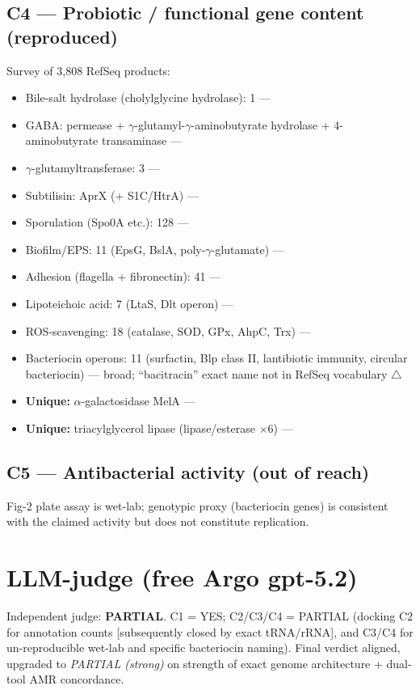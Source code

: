 \documentclass[11pt]{article}
\begin{document}
\subsection{C4 --- Probiotic / functional gene content (reproduced)}
Survey of 3,808 RefSeq products:
\begin{itemize}[leftmargin=*,noitemsep]
    \item Bile-salt hydrolase (cholylglycine hydrolase): 1 --- \checkmark
    \item GABA: permease + $\gamma$-glutamyl-$\gamma$-aminobutyrate hydrolase + 4-aminobutyrate transaminase --- \checkmark
    \item $\gamma$-glutamyltransferase: 3 --- \checkmark
    \item Subtilisin: AprX (+ S1C/HtrA) --- \checkmark
    \item Sporulation (Spo0A etc.): 128 --- \checkmark
    \item Biofilm/EPS: 11 (EpsG, BslA, poly-$\gamma$-glutamate) --- \checkmark
    \item Adhesion (flagella + fibronectin): 41 --- \checkmark
    \item Lipoteichoic acid: 7 (LtaS, Dlt operon) --- \checkmark
    \item ROS-scavenging: 18 (catalase, SOD, GPx, AhpC, Trx) --- \checkmark
    \item Bacteriocin operons: 11 (surfactin, Blp class II, lantibiotic immunity, circular bacteriocin) --- \checkmark broad; ``bacitracin'' exact name not in RefSeq vocabulary $\triangle$
    \item \textbf{Unique:} $\alpha$-galactosidase MelA --- \checkmark
    \item \textbf{Unique:} triacylglycerol lipase (lipase/esterase $\times$6) --- \checkmark
\end{itemize}

\subsection{C5 --- Antibacterial activity (out of reach)}
Fig-2 plate assay is wet-lab; genotypic proxy (bacteriocin genes) is consistent with the claimed activity but does not constitute replication.

\section{LLM-judge (free Argo gpt-5.2)}
Independent judge: \textbf{PARTIAL}. C1 = YES; C2/C3/C4 = PARTIAL (docking C2 for annotation counts [subsequently closed by exact tRNA/rRNA], and C3/C4 for un-reproducible wet-lab and specific bacteriocin naming). Final verdict aligned, upgraded to \emph{PARTIAL (strong)} on strength of exact genome architecture + dual-tool AMR concordance.
\end{document}
